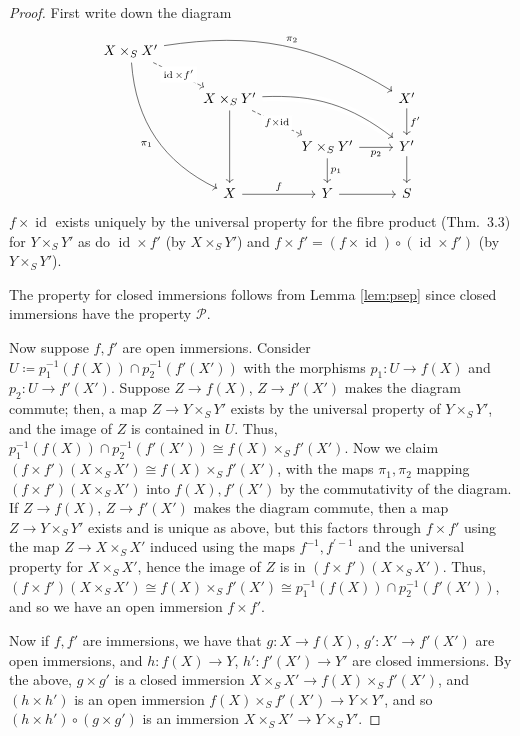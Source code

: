 \documentclass[10pt]{article}
\theoremstyle{definition}
\theoremstyle{remark}
\numberwithin{equation}{section}
\numberwithin{figure}{subsubsection}
\DeclareMathOperator{\id}{id}
\begin{document}
\begin{proof}
  First write down the diagram
  \begin{equation*}
    \begin{tikzcd}
      X \times_S X'\arrow[dashed]{dr}[description]{\id \times f'}\arrow[bend right]{dddr}[swap]{\pi_1}\arrow[bend left=20]{drrr}{\pi_2}\\
      & X \times_S Y'\arrow{dd}\arrow[dashed]{dr}[description]{f \times \id}\arrow[bend left=20,crossing over]{drr} & & X'\dar{f'}\\
      & & Y \times_S Y' \rar[swap]{p_2}\dar{p_1} & Y'\dar\\
      & X \rar{f} & Y \rar & S
    \end{tikzcd}
  \end{equation*}
  $f \times \id$ exists uniquely by the universal property for the fibre product (Thm.~3.3) for $Y \times_S Y'$ as do $\id \times f'$ (by $X \times_S Y'$) and $f \times f' = (f \times \id) \circ (\id \times f')$ (by $Y \times_S Y'$).
  \par The property for closed immersions follows from Lemma \ref{lem:psep}
  since closed immersions have the property $\mathscr{P}$.
  \par Now suppose $f,f'$ are open immersions. Consider $U \coloneqq p_1^{-1}(f(X)) \cap p_2^{-1}(f'(X'))$ with the morphisms $p_1\colon U \to f(X)$ and $p_2\colon U \to f'(X')$. Suppose $Z \to f(X)$, $Z \to f'(X')$ makes the diagram commute; then, a map $Z \to Y \times_S Y'$ exists by the universal property of $Y \times_S Y'$, and the image of $Z$ is contained in $U$. Thus, $p_1^{-1}(f(X)) \cap p_2^{-1}(f'(X')) \cong f(X) \times_S f'(X')$. Now we claim $(f \times f')(X \times_S X') \cong f(X) \times_S f'(X')$, with the maps $\pi_1,\pi_2$ mapping $(f \times f')(X \times_S X')$ into $f(X),f'(X')$ by the commutativity of the diagram. If $Z \to f(X)$, $Z \to f'(X')$ makes the diagram commute, then a map $Z \to Y \times_S Y'$ exists and is unique as above, but this factors through $f \times f'$ using the map $Z \to X \times_S X'$ induced using the maps $f^{-1},f^{\prime-1}$ and the universal property for $X \times_S X'$, hence the image of $Z$ is in $(f \times f')(X \times_S X')$. Thus, $(f \times f')(X \times_S X') \cong f(X) \times_S f'(X') \cong p_1^{-1}(f(X)) \cap p_2^{-1}(f'(X'))$, and so we have an open immersion $f \times f'$.
  \par Now if $f,f'$ are immersions, we have that $g \colon X \to f(X)$, $g'\colon X' \to f'(X')$ are open immersions, and $h\colon f(X) \to Y$, $h'\colon f'(X') \to Y'$ are closed immersions. By the above, $g \times g'$ is a closed immersion $X \times_S X' \to f(X) \times_S f'(X')$, and $(h \times h')$ is an open immersion $f(X) \times_S f'(X') \to Y \times Y'$, and so $(h \times h') \circ (g \times g')$ is an immersion $X \times_S X' \to Y \times_S Y'$.
\end{proof}
\end{document}
